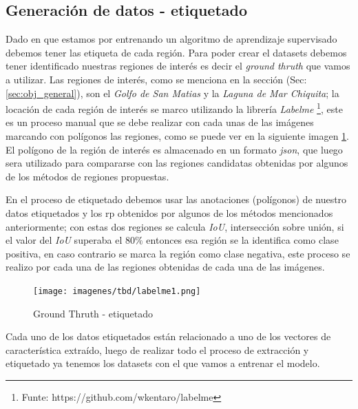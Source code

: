 \subsection{Generación de datos - etiquetado}\label{sub:generacion_datos_etiquetado}

Dado en que estamos por entrenando un algoritmo de aprendizaje supervisado debemos tener las etiqueta de cada región. Para poder crear el datasets debemos tener identificado nuestras regiones de interés es decir el \textit{ground thruth} que vamos a utilizar. Las regiones de interés, como se menciona en la sección (Sec:\ref{sec:obj_general}), son el \textit{Golfo de San Matias} y la \textit{Laguna de Mar Chiquita}; la locación de cada región de interés se marco utilizando la librería \textit{Labelme} \footnote{Funte: https://github.com/wkentaro/labelme}, este es un proceso manual que se debe realizar con cada unas de las imágenes marcando con polígonos las regiones, como se puede ver en la siguiente imagen \ref{Fig:labelme-etiquetado}. El polígono de la región de interés es almacenado en un formato \textit{json}, que luego sera utilizado para compararse con las regiones candidatas obtenidas por algunos de los métodos de regiones propuestas. 


En el proceso de etiquetado debemos usar las anotaciones (polígonos) de nuestro datos etiquetados y los \ac{rp} obtenidos por algunos de los métodos mencionados anteriormente; con estas dos regiones se calcula \textit{IoU}, intersección sobre unión, si el valor del \textit{IoU} superaba el $80\%$ entonces esa región se la identifica como clase positiva, en caso contrario se marca la región como clase negativa, este proceso se realizo por cada una de las regiones obtenidas de cada una de las imágenes.

\begin{figure}[H] \centering
  \texttt{[image: imagenes/tbd/labelme1.png]}
  \caption{Ground Thruth - etiquetado}\label{Fig:labelme-etiquetado}
\end{figure}

Cada uno de los datos etiquetados están relacionado a uno de los vectores de característica extraído, luego de realizar todo el proceso de extracción y etiquetado ya tenemos los datasets con el que vamos a entrenar el modelo.